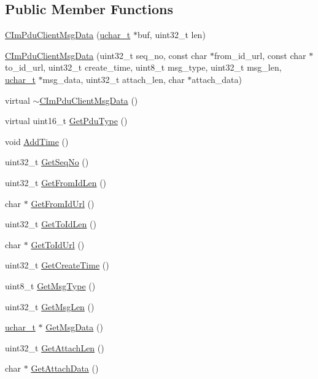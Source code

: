 \subsection*{Public Member Functions}
\begin{DoxyCompactItemize}
\item 
\hyperlink{class_c_im_pdu_client_msg_data_a26020af0c039fd38941edeb0b06f6798}{C\+Im\+Pdu\+Client\+Msg\+Data} (\hyperlink{base_2ostype_8h_a124ea0f8f4a23a0a286b5582137f0b8d}{uchar\+\_\+t} $\ast$buf, uint32\+\_\+t len)
\item 
\hyperlink{class_c_im_pdu_client_msg_data_a34cc1f63ee92ff1ceeeef0fe3935263b}{C\+Im\+Pdu\+Client\+Msg\+Data} (uint32\+\_\+t seq\+\_\+no, const char $\ast$from\+\_\+id\+\_\+url, const char $\ast$to\+\_\+id\+\_\+url, uint32\+\_\+t create\+\_\+time, uint8\+\_\+t msg\+\_\+type, uint32\+\_\+t msg\+\_\+len, \hyperlink{base_2ostype_8h_a124ea0f8f4a23a0a286b5582137f0b8d}{uchar\+\_\+t} $\ast$msg\+\_\+data, uint32\+\_\+t attach\+\_\+len, char $\ast$attach\+\_\+data)
\item 
virtual \hyperlink{class_c_im_pdu_client_msg_data_a4f75a668e400db7bf8f71c159922ba6c}{$\sim$\+C\+Im\+Pdu\+Client\+Msg\+Data} ()
\item 
virtual uint16\+\_\+t \hyperlink{class_c_im_pdu_client_msg_data_ad49f330ba5c9fad30ffd1e298256c9cb}{Get\+Pdu\+Type} ()
\item 
void \hyperlink{class_c_im_pdu_client_msg_data_a858d584849f37a5c576fbe6691348661}{Add\+Time} ()
\item 
uint32\+\_\+t \hyperlink{class_c_im_pdu_client_msg_data_a219213c1d787e3ed1208c41b99c8ea63}{Get\+Seq\+No} ()
\item 
uint32\+\_\+t \hyperlink{class_c_im_pdu_client_msg_data_aff8034804fb1867a12a04a5547a47ee1}{Get\+From\+Id\+Len} ()
\item 
char $\ast$ \hyperlink{class_c_im_pdu_client_msg_data_a71e94918a365f05b676dd230083ea0c0}{Get\+From\+Id\+Url} ()
\item 
uint32\+\_\+t \hyperlink{class_c_im_pdu_client_msg_data_a269b8017a7db744cdd2ec1bc002420f1}{Get\+To\+Id\+Len} ()
\item 
char $\ast$ \hyperlink{class_c_im_pdu_client_msg_data_a2d0113c2e2922ffba5bdf4eb4cdc46d1}{Get\+To\+Id\+Url} ()
\item 
uint32\+\_\+t \hyperlink{class_c_im_pdu_client_msg_data_a2177fbc9b4b487942d150127effc2c0d}{Get\+Create\+Time} ()
\item 
uint8\+\_\+t \hyperlink{class_c_im_pdu_client_msg_data_a4b902c986cdd07a98beb5b95f28e6c16}{Get\+Msg\+Type} ()
\item 
uint32\+\_\+t \hyperlink{class_c_im_pdu_client_msg_data_a6321c1d736f6eeeaaa840e88e48682ee}{Get\+Msg\+Len} ()
\item 
\hyperlink{base_2ostype_8h_a124ea0f8f4a23a0a286b5582137f0b8d}{uchar\+\_\+t} $\ast$ \hyperlink{class_c_im_pdu_client_msg_data_abd1f96c3065523033ed48bf3ce73902f}{Get\+Msg\+Data} ()
\item 
uint32\+\_\+t \hyperlink{class_c_im_pdu_client_msg_data_a1e78acbed0b3899bdf906df9d1aabbea}{Get\+Attach\+Len} ()
\item 
char $\ast$ \hyperlink{class_c_im_pdu_client_msg_data_a17ba0ba6b6ad01f807ad6a9c7d5c5092}{Get\+Attach\+Data} ()
\end{DoxyCompactItemize}

